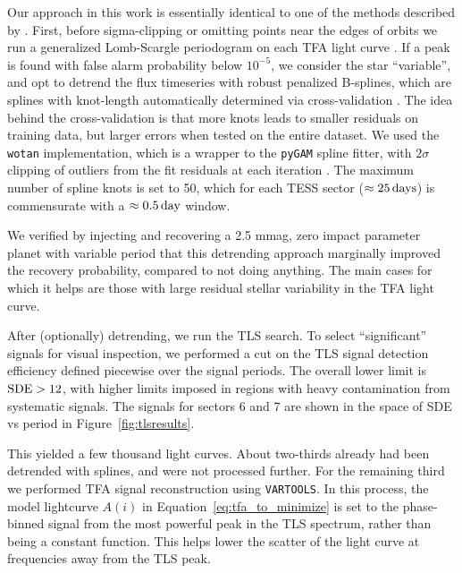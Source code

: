 \documentclass[12pt,twocolumn,tighten]{aastex62}
\begin{document}
Our approach in this work is essentially identical to one of the
methods described by \citet{hippke_wotan_2019}.  First, before
sigma-clipping or omitting points near the edges of orbits we run a
generalized Lomb-Scargle periodogram on each TFA light curve
\citep{lomb_1976,scargle_studies_1982,vanderplas_periodograms_2015}.
If a peak is found with false alarm probability below $10^{-5}$, we
consider the star ``variable'', and opt to detrend the flux timeseries
with robust penalized B-splines, which are splines with knot-length
automatically determined via cross-validation
\citep{eilers_flexible_1996}. The idea behind the cross-validation is
that more knots leads to smaller residuals on training data, but
larger errors when tested on the entire dataset.  We used the
\texttt{wotan} implementation, which is a wrapper to the
\texttt{pyGAM} spline fitter, with $2\sigma$ clipping of outliers from
the fit residuals at each iteration
\citep{serven_pygam_2018_1476122,hippke_wotan_2019}.  The maximum
number of spline knots is set to 50, which for each TESS sector
($\approx 25\,{\rm days}$) is commensurate with a $\approx0.5\,{\rm
day}$ window.

We verified by injecting and recovering a 2.5 mmag, zero impact
parameter 
planet with variable period that this detrending approach marginally
improved the recovery probability, compared to not doing anything.
The main cases for which it helps are those with large residual
stellar variability in the TFA light curve.

After (optionally) detrending, we run the TLS search. To select
``significant'' signals for visual inspection, we performed a cut on
the TLS signal detection efficiency defined piecewise over the signal
periods.  The overall lower limit is ${\rm SDE} > 12$, with higher
limits imposed in regions with heavy contamination from systematic
signals.  The signals for sectors 6 and 7 are shown in the space of
SDE vs period in Figure~\ref{fig:tlsresults}.

This yielded a few thousand light curves.  About two-thirds already
had been detrended with splines, and were not processed further.  For
the remaining third we performed TFA signal reconstruction using
\texttt{VARTOOLS}.  In this process, the model lightcurve $A(i)$ in
Equation~\ref{eq:tfa_to_minimize} is set to the phase-binned signal
from the most powerful peak in the TLS spectrum, rather than being a
constant function.  This helps lower the scatter of the light curve at
frequencies away from the TLS peak.
\end{document}
